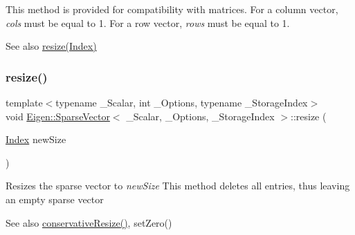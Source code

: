 This method is provided for compatibility with matrices. For a column vector, {\itshape cols} must be equal to 1. For a row vector, {\itshape rows} must be equal to 1.

\begin{DoxySeeAlso}{See also}
\mbox{\hyperlink{class_eigen_1_1_sparse_vector_a1020011c75fb70b21257c8d04ee07514}{resize(\+Index)}} 
\end{DoxySeeAlso}
\mbox{\label{class_eigen_1_1_sparse_vector_a1020011c75fb70b21257c8d04ee07514}} 
\subsubsection{\texorpdfstring{resize()}{resize()}\hspace{0.1cm}{\footnotesize\ttfamily [2/2]}}
{\footnotesize\ttfamily template$<$typename \+\_\+\+Scalar, int \+\_\+\+Options, typename \+\_\+\+Storage\+Index$>$ \\
void \mbox{\hyperlink{class_eigen_1_1_sparse_vector}{Eigen\+::\+Sparse\+Vector}}$<$ \+\_\+\+Scalar, \+\_\+\+Options, \+\_\+\+Storage\+Index $>$\+::resize (\begin{DoxyParamCaption}\item[{\mbox{\hyperlink{struct_eigen_1_1_eigen_base_a554f30542cc2316add4b1ea0a492ff02}{Index}}}]{new\+Size }\end{DoxyParamCaption})\hspace{0.3cm}{\ttfamily [inline]}}

Resizes the sparse vector to {\itshape new\+Size} This method deletes all entries, thus leaving an empty sparse vector

\begin{DoxySeeAlso}{See also}
\mbox{\hyperlink{class_eigen_1_1_sparse_vector_ab8dbb1f73b6250c10c0860eb13ca5cca}{conservative\+Resize()}}, set\+Zero() 
\end{DoxySeeAlso}
\mbox{\label{class_eigen_1_1_sparse_vector_a05e8aff0ba5c4dd4ab69e173d80d1a68}} 

